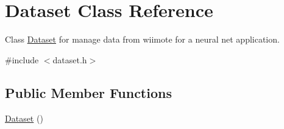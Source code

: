 \hypertarget{class_dataset}{\section{Dataset Class Reference}
\label{class_dataset}
}


Class \hyperlink{class_dataset}{Dataset} for manage data from wiimote for a neural net application.  




{\ttfamily \#include $<$dataset.\-h$>$}

\subsection*{Public Member Functions}
\begin{DoxyCompactItemize}
\item 
\hypertarget{class_dataset_a2ef0a4a688a218d55ef061c6df659a4a}{\hyperlink{class_dataset_a2ef0a4a688a218d55ef061c6df659a4a}{Dataset} ()}\label{class_dataset_a2ef0a4a688a218d55ef061c6df659a4a}


\end{DoxyCompactItemize}

